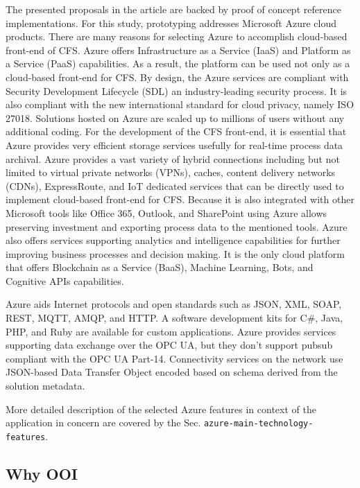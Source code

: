 \documentclass[
]{article}
\begin{document}
The presented proposals in the article are backed by proof of concept
reference implementations. For this study, prototyping addresses
Microsoft Azure cloud products. There are many reasons for selecting
Azure to accomplish cloud-based front-end of CFS. Azure offers
Infrastructure as a Service (IaaS) and Platform as a Service (PaaS)
capabilities. As a result, the platform can be used not only as a
cloud-based front-end for CFS. By design, the Azure services are
compliant with Security Development Lifecycle (SDL) an industry-leading
security process. It is also compliant with the new international
standard for cloud privacy, namely ISO 27018. Solutions hosted on Azure
are scaled up to millions of users without any additional coding. For
the development of the CFS front-end, it is essential that Azure
provides very efficient storage services usefully for real-time process
data archival. Azure provides a vast variety of hybrid connections
including but not limited to virtual private networks (VPNs), caches,
content delivery networks (CDNs), ExpressRoute, and IoT dedicated
services that can be directly used to implement cloud-based front-end
for CFS. Because it is also integrated with other Microsoft tools like
Office 365, Outlook, and SharePoint using Azure allows preserving
investment and exporting process data to the mentioned tools. Azure also
offers services supporting analytics and intelligence capabilities for
further improving business processes and decision making. It is the only
cloud platform that offers Blockchain as a Service (BaaS), Machine
Learning, Bots, and Cognitive APIs capabilities.

Azure aids Internet protocols and open standards such as JSON, XML,
SOAP, REST, MQTT, AMQP, and HTTP. A software development kits for C\#,
Java, PHP, and Ruby are available for custom applications. Azure
provides services supporting data exchange over the OPC UA, but they
don't support pubsub compliant with the OPC UA Part-14. Connectivity
services on the network use JSON-based Data Transfer Object encoded
based on schema derived from the solution metadata.

More detailed description of the selected Azure features in context of
the application in concern are covered by the Sec.
\texttt{azure-main-technology-features}.

\hypertarget{why-ooi}{%
\subsection{Why OOI}\label{why-ooi}}
\end{document}
